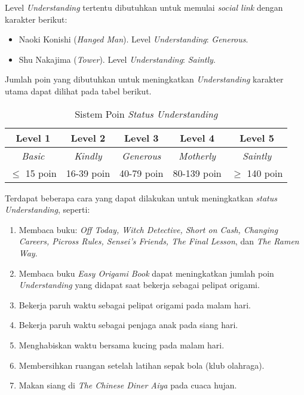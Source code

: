 Level \textit{Understanding} tertentu dibutuhkan untuk memulai \textit{social link} dengan karakter berikut:
\begin{itemize}
    \item Naoki Konishi (\textit{Hanged Man}). Level \textit{Understanding}: \textit{Generous}.
    \item Shu Nakajima (\textit{Tower}). Level \textit{Understanding}: \textit{Saintly}.
\end{itemize}

Jumlah poin yang dibutuhkan untuk meningkatkan \textit{Understanding} karakter utama dapat dilihat pada tabel berikut.
\begin{table}[htb]
    \begin{center}
        \begin{tabular}{ | c | c | c | c | c | }
            \hline
            Level 1        & Level 2         & Level 3           & Level 4           & Level 5          \\
            \hline
            \textit{Basic} & \textit{Kindly} & \textit{Generous} & \textit{Motherly} & \textit{Saintly} \\
            \hline
            $\le$ 15 poin  & 16-39 poin      & 40-79 poin        & 80-139 poin       & $\ge$ 140 poin   \\
            \hline
        \end{tabular}
    \end{center}
    \caption{Sistem Poin \textit{Status Understanding}}
\end{table}

Terdapat beberapa cara yang dapat dilakukan untuk meningkatkan \textit{status Understanding}, seperti:
\begin{enumerate}
    \item Membaca buku: \textit{Off Today, Witch Detective, Short on Cash, Changing Careers, Picross Rules, Sensei’s Friends, The Final Lesson}, dan \textit{The Ramen Way}.
    \item Membaca buku \textit{Easy Origami Book} dapat meningkatkan jumlah poin \textit{Understanding} yang didapat saat bekerja sebagai pelipat origami.
    \item Bekerja paruh waktu sebagai pelipat origami pada malam hari.
    \item Bekerja paruh waktu sebagai penjaga anak pada siang hari.
    \item Menghabiskan waktu bersama kucing pada malam hari.
    \item Membersihkan ruangan setelah latihan sepak bola (klub olahraga).
    \item Makan siang di \textit{The Chinese Diner Aiya} pada cuaca hujan.
\end{enumerate}

